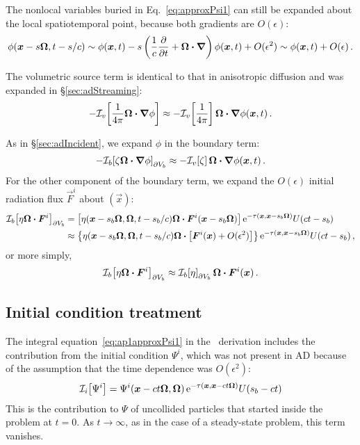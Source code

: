 The nonlocal variables buried in Eq.~\eqref{eq:approxPsi1} can still be expanded
about the local spatiotemporal point, because both gradients are $O(\epsilon)$:
\begin{equation} \label{eq:ap1taylorPhi}
  \phi(\bm{x} - s \bm{\Omega}, t-s/c)
  \sim \phi(\bm{x},t) - s \left( \frac{1}{c} \frac{\partial }{\partial t} + \bm{\Omega} \bm{\cdot}
  \bm{\nabla}  \right) \phi (\bm{x}, t) + O(\epsilon^2) \sim \phi(\bm{x},t) +
  O(\epsilon) \,.
\end{equation}

The volumetric source term is identical to that in anisotropic diffusion and was
expanded in \S\ref{sec:adStreaming}:
\begin{equation*}
  - \mathcal{I}_{v}\!\left[\frac{1}{4\pi} \bm{\Omega}\bm{\cdot} \bm{\nabla} \phi\right]
  \approx  - \mathcal{I}_{v}\!\left[\frac{1}{4\pi}\right] \bm{\Omega}\bm{\cdot} \bm{\nabla}
  \phi(\bm{x},t) \,.
\end{equation*}

As in \S\ref{sec:adIncident}, we expand $\phi$ in the boundary term:
\begin{equation*}
-\mathcal{I}_{b}\!\left[\zeta \bm{\Omega}\bm{\cdot} \bm{\nabla} \phi\right]_{\partial V_b}
  \approx  - \mathcal{I}_{v}\!\left[\zeta\right] \bm{\Omega}\bm{\cdot} \bm{\nabla}
  \phi(\bm{x},t) \,.
\end{equation*}
For the other component of the boundary term, we expand the $O(\epsilon)$
initial radiation flux $\vec{F}^i$ about $(\vec{x})$:
\begin{align*} \nonumber
\mathcal{I}_{b}\!\left[\eta \bm{\Omega}\bm{\cdot} \bm{F}^i\right]_{\partial V_b}
&= \left[\eta(\bm{x} - s_b\bm{\Omega}, \bm{\Omega}, t - s_b/c)
    \bm{\Omega}\bm{\cdot} \bm{F}^i(\bm{x} - s_b\bm{\Omega}) \right]
    \mathop{}\!\mathrm{e}^{ -\tau(\bm{x}, \bm{x} - s_b \bm{\Omega})} U(ct - s_b)
    \\
&\approx \left\{\eta(\bm{x} - s_b\bm{\Omega}, \bm{\Omega}, t - s_b/c)
\bm{\Omega}\bm{\cdot} \left[
\bm{F}^i(\bm{x}) + O(\epsilon^2)\right] \right\}
  \mathop{}\!\mathrm{e}^{ -\tau(\bm{x}, \bm{x} - s_b \bm{\Omega})} U(ct - s_b)\,,
\end{align*}
or more simply,
\begin{equation*}
\mathcal{I}_{b}\!\left[\eta \bm{\Omega}\bm{\cdot} \bm{F}^i\right]_{\partial V_b}
  \approx \mathcal{I}_{b}\!\left[\eta\right]_{\partial V_b}
  \bm{\Omega}\bm{\cdot} \bm{F}^i(\bm{x}) \,.
\end{equation*}

\subsection{Initial condition treatment}\label{sec:ap1ic}
The integral equation~\eqref{eq:ap1approxPsi1} in the \APone\ derivation
includes the contribution from the initial condition $\Psi^i$, which was not
present in AD because of the assumption that the time dependence was
$O(\epsilon^2)$:
\begin{equation*}
  \mathcal{I}_{i}\!\left[\Psi^i\right] = \Psi^i( \bm{x} - ct \bm{\Omega}, \bm{\Omega})
    \mathop{}\!\mathrm{e}^{ -\tau(\bm{x}, \bm{x} - ct \bm{\Omega})} U( s_b - ct)
\end{equation*}
This is the contribution to $\Psi$ of uncollided particles that started
inside the problem at $t=0$. As $t\to\infty$, as in the case of a steady-state
problem, this term vanishes.

